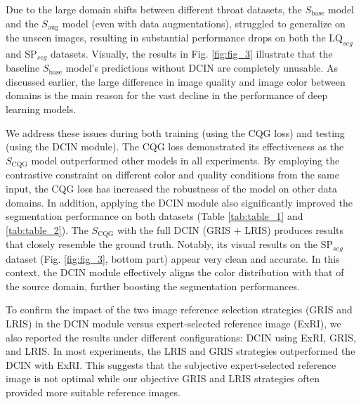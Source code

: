 Due to the large domain shifts between different throat datasets, the $S_{\mathrm{base}}$ model and the $S_{\mathrm{aug}}$ model (even with data augmentations), struggled to generalize on the unseen images, resulting in substantial performance drops on both the $\mathrm{LQ}_{seg}$ and $\mathrm{SP}_{seg}$ datasets. 
Visually, the results in Fig. \ref{fig:fig_3} illustrate that the baseline $S_{\mathrm{base}}$ model's predictions without DCIN are completely unusable. 
As discussed earlier, the large difference in image quality and image color between domains is the main reason for the vast decline in the performance of deep learning models. 

We address these issues during both training (using the CQG loss) and testing (using the DCIN module). 
The CQG loss demonstrated its effectiveness as the $S_{\mathrm{CQG}}$ model outperformed other models in all experiments. 
By employing the contrastive constraint on different color and quality conditions from the same input, the CQG loss has increased the robustness of the model on other data domains. 
In addition, applying the DCIN module also significantly improved the segmentation performance on both datasets (Table \ref{tab:table_1} and \ref{tab:table_2}). 
The $S_{\mathrm{CQG}}$ with the full DCIN (GRIS + LRIS) produces results that closely resemble the ground truth. 
Notably, its visual results on the $\mathrm{SP}_{seg}$ dataset (Fig. \ref{fig:fig_3}, bottom part) appear very clean and accurate. 
In this context, the DCIN module effectively aligns the color distribution with that of the source domain, further boosting the segmentation performances. 

To confirm the impact of the two image reference selection strategies (GRIS and LRIS) in the DCIN module versus expert-selected reference image (ExRI), we also reported the results under different configurations: DCIN using ExRI, GRIS, and LRIS. 
In most experiments, the LRIS and GRIS strategies outperformed the DCIN with ExRI. 
This suggests that the subjective expert-selected reference image is not optimal while our objective GRIS and LRIS strategies often provided more suitable reference images. 

